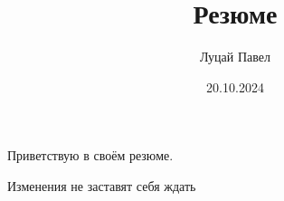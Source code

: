 \documentclass{article}
\begin{document}
\title{Резюме}
\author{Луцай Павел}
\date{20.10.2024}
\maketitle
\center
Приветствую в своём резюме.  

Изменения не заставят себя ждать
\end{document}
